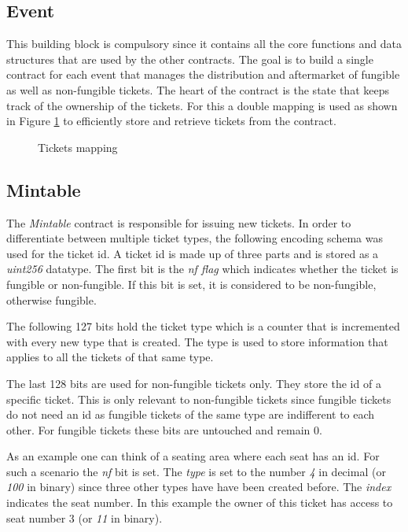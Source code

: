 \subsection{Event}
This building block is compulsory since it contains all the core functions and data structures that are used by the other contracts. The goal is to build a single contract for each event that manages the distribution and aftermarket of fungible as well as non-fungible tickets. The heart of the contract is the state that keeps track of the ownership of the tickets. For this a double mapping is used as shown in Figure \ref{code:tickets} to efficiently store and retrieve tickets from the contract.

\begin{figure}[hbt]
    
    \caption{Tickets mapping}
    \label{code:tickets}
\end{figure}


\subsection{Mintable}\label{sec:tickets}
The \textit{Mintable} contract is responsible for issuing new tickets. In order to differentiate between multiple ticket types, the following encoding schema was used for the ticket id. A ticket id is made up of three parts and is stored as a \textit{uint256} datatype. The first bit is the \textit{nf flag} which indicates whether the ticket is fungible or non-fungible. If this bit is set, it is considered to be non-fungible, otherwise fungible. 

The following 127 bits hold the ticket type which is a counter that is incremented with every new type that is created. The type is used to store information that applies to all the tickets of that same type. 

The last 128 bits are used for non-fungible tickets only. They store the id of a specific ticket. This is only relevant to non-fungible tickets since fungible tickets do not need an id as fungible tickets of the same type are indifferent to each other. For fungible tickets these bits are untouched and remain 0.

As an example one can think of a seating area where each seat has an id. For such a scenario the \textit{nf} bit is set. The \textit{type} is set to the number \textit{4} in decimal (or \textit{100} in binary) since three other types have have been created before. The \textit{index} indicates the seat number. In this example the owner of this ticket has access to seat number 3 (or \textit{11} in binary).

